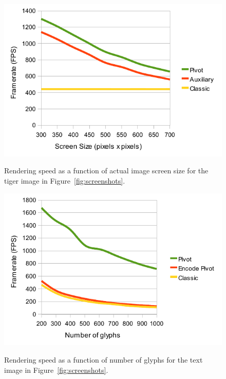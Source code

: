 \documentclass[11pt,a4paper,twoside]{article}
\begin{document}
\begin {figure} [t]
\centering
\begin {minipage} [b] {0.45\linewidth}
	\centering
	\includegraphics[width=1.0\columnwidth] {figures/graph_size_render}
	\caption {Rendering speed as a function of actual image screen size for the tiger image in Figure~\ref{fig:screenshots}.}
	\label {fig:graph_size_render}
\end {minipage}
\hspace{0.5cm}
\begin{minipage} [b] {0.45\linewidth}
	\centering
	\includegraphics[width=1.0\columnwidth] {figures/graph_glyphs_render}
	\caption {Rendering speed as a function of number of glyphs for the text image in Figure~\ref{fig:screenshots}.}
	\label {fig:graph_glyphs_render}
\end {minipage}
\end {figure}
\end{document}
